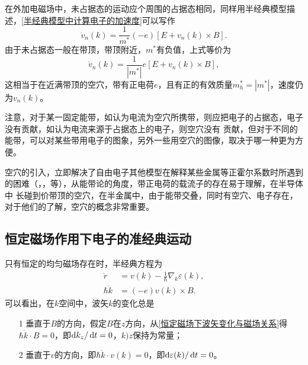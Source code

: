             在外加电磁场中，未占据态的运动应个周围的占据态相同，同样用半经典模型描述，\autoref{半经典模型中计算电子的加速度}可以写作
            \begin{equation}
                \dot{v}_n(k)=\frac{1}{m^*}(-e)[E+ v_n(k)\times B].
            \end{equation}
            由于未占据态一般在带顶，带顶附近，$m^*$有负值，上式等价为
            \begin{equation}
                \dot{v}_n(k)=\frac{1}{|m^*|}e\left[ E+v_n(k)\times B \right],
            \end{equation}
            这相当于在近满带顶的空穴，带有正电荷$e$，且有正的有效质量$m^*_h=|m^*|$，速度仍为$v_n(k)$。

            注意，对于某一固定能带，如认为电流为空穴所携带，则应把电子的占据态，电子没有贡献，如认为电流来源于占据态上的电子，则空穴没有
            贡献，但对于不同的能带，可以对某些带用电子的图象，另外一些用空穴的图像，取决于哪一种更为方便。

            空穴的引入，立即解决了自由电子其他模型在解释某些金属等正霍尔系数时所遇到的困难（，，等），从能带论的角度，带正电荷的载流子的存在易于理解，在半导体中
            长碰到价带顶的空穴，在半金属中，由于能带交叠，同时有空穴、电子存在，对于他们的了解，空穴的概念非常重要。

        \subsection{恒定磁场作用下电子的准经典运动}
            只有恒定的均匀磁场存在时，半经典方程为
            \begin{align}
                \dot{r}&=v(k)-\frac{1}{\hbar}\nabla_k\varepsilon(k)\label{恒定磁场下速度与波矢关系},\\
                \hbar\dot{k}&=(-e)v(k)\times B\label{恒定磁场下波矢变化与磁场关系}.
            \end{align}
            可以看出，在$k$空间中，波矢$k$的变化总是
            \begin{itemize}
                \item[1] 垂直于$B$的方向，假定$B$在$z$方向，从\autoref{恒定磁场下波矢变化与磁场关系}得$\hbar \dot{k}\cdot B=0$，即$\mathop{}\!\mathrm{d} k_z/\mathop{}\!\mathrm{d} t=0$，$k)z$保持为常量；
                \item[2] 垂直于$v$的方向，即$\hbar\dot{k}\cdot v(k)=0$，即$\mathop{}\!\mathrm{d} \varepsilon(k)/\mathop{}\!\mathrm{d} t=0$。
            \end{itemize}

